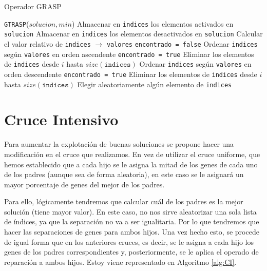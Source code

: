 \begin{algorithm}
\caption{Operador GRASP}\label{alg:GRASP}
\begin{algorithmic}[1]
\Procedure \texttt{GTRASP}($solucion, min$)
	\State Almacenar en \texttt{indices} los elementos activados en \texttt{solucion}
\Else
	\State Almacenar en \texttt{indices} los elementos desactivados en \texttt{solucion}
\EndIf
\State Calcular el valor relativo de \texttt{indices} $\xrightarrow{}{}$ \texttt{valores}
\State \texttt{encontrado = false}
	\State Ordenar \texttt{indices} según \texttt{valores} en orden ascendente
			\State \texttt{encontrado = true}
			\State Eliminar los elementos de \texttt{indices} desde $i$ hasta $size(\texttt{indices})$
		\EndIf
	\EndFor
\Else
	\State Ordenar \texttt{indices} según \texttt{valores} en orden descendente
			\State \texttt{encontrado = true}
			\State Eliminar los elementos de \texttt{indices} desde $i$ hasta $size(\texttt{indices})$
		\EndIf
	\EndFor
\EndIf
\State Elegir aleatoriamente algún elemento de \texttt{indices}
\EndProcedure
\end{algorithmic}
\end{algorithm}

\section{Cruce Intensivo}

Para aumentar la explotación de buenas soluciones se propone hacer una modificación en el cruce que realizamos. 
En vez de utilizar el cruce uniforme, que hemos establecido que a cada hijo se le asigna la mitad de los genes de cada uno de los padres (aunque sea de forma aleatoria), en este caso se le asignará un mayor porcentaje de genes del mejor de los padres. 

Para ello, lógicamente tendremos que calcular cuál de los padres es la mejor solución (tiene mayor valor). 
En este caso, no nos sirve aleatorizar una sola lista de índices, ya que la separación no va a ser igualitaria. 
Por lo que tendremos que hacer las separaciones de genes para ambos hijos. 
Una vez hecho esto, se procede de igual forma que en los anteriores cruces, es decir, se le asigna a cada hijo los genes de los padres correspondientes y, posteriormente, se le aplica el operado de reparación a ambos hijos. 
Estoy viene representado en Algoritmo \ref{alg:CI}. 

